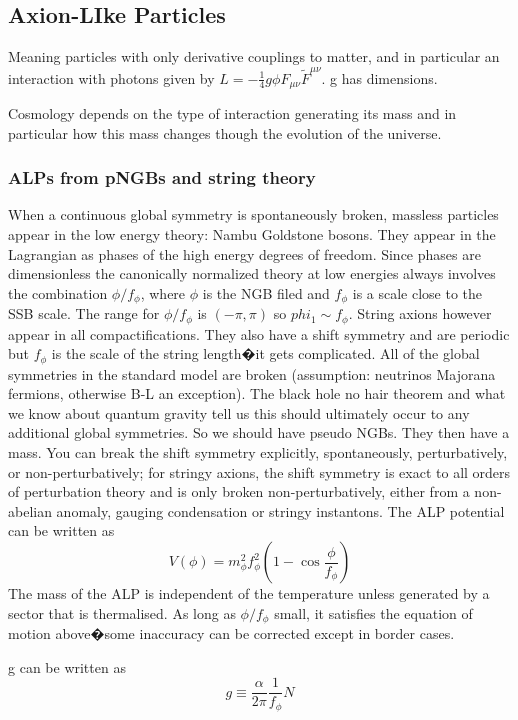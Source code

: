 \documentclass[12pt, twoside]{book}
\begin{document}
\subsection{Axion-LIke Particles}
Meaning particles with only derivative couplings to matter, and in particular an interaction with photons given by $L = -\frac{1}{4}g\phi F_{\mu\nu}\tilde F^{\mu\nu}$. g has dimensions.

Cosmology depends on the type of interaction generating its mass and in particular how this mass changes though the evolution of the universe.
\subsubsection{ALPs from pNGBs and string theory}

When a continuous global symmetry is spontaneously broken, massless particles appear in the low energy theory: Nambu Goldstone bosons. They appear in the Lagrangian as phases of the high energy degrees of freedom. Since phases are dimensionless the canonically normalized theory at low energies always involves the combination $\phi/f_{\phi}$, where $\phi$ is the NGB filed and $f_{\phi}$ is a scale close to the SSB scale. The range for $\phi/f_{\phi}$ is $(-\pi, \pi)$ so $phi_1 \sim f_\phi$. String axions however appear in all compactifications. They also have a shift symmetry and are periodic but $f_\phi$ is the scale of the string length�it gets complicated.
All of the global symmetries in the standard model are broken (assumption: neutrinos Majorana fermions, otherwise B-L an exception). The black hole no hair theorem and what we know about quantum gravity tell us this should ultimately occur to any additional global symmetries. So we should have pseudo NGBs. They then have a mass.
You can break the shift symmetry explicitly, spontaneously, perturbatively, or non-perturbatively; for stringy axions, the shift symmetry is exact to all orders of perturbation theory and is only broken non-perturbatively, either from a non-abelian anomaly, gauging condensation or stringy instantons. The ALP potential can be written as
\[
V(\phi) = m_\phi^2 f_\phi^2 (1-\cos{\frac{\phi}{f_\phi}})
\]
The mass of the ALP is independent of the temperature unless generated by a sector that is thermalised. As long as $\phi/f_{\phi}$ small, it satisfies the equation of motion above�some inaccuracy can be corrected except in border cases.

g can be written as 
\[
g \equiv \frac{\alpha}{2\pi}\frac{1}{f_\phi}N
\]
\end{document}
